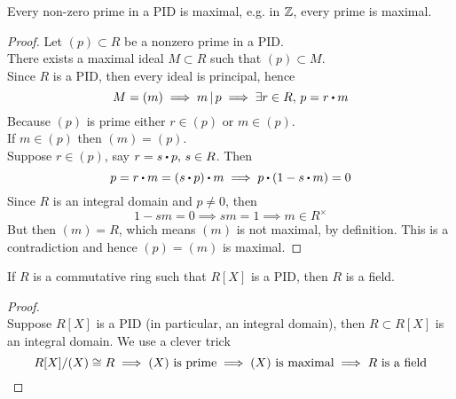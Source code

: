 \documentclass[../Main.tex]{subfiles}
\begin{document}
\begin{thm}[title = Nonzero primes ideals are maximal in PID]
	Every non-zero prime in a PID is maximal, e.g. in $\mathbb{Z}$, every prime is maximal.
\end{thm}
\begin{proof}
	Let $(p)\subset R$ be a nonzero prime in a PID.\\
	There exists a maximal ideal $M\subset R $ such that $(p)\subset M$.\\
	Since $R$ is a PID, then every ideal is principal, hence
	\[M=(m) \implies \divs{m}{p} \implies \exists r\in R, \, p=r\rdot m\]
	Because $(p)$ is prime either $r\in (p)$ or $m \in (p)$.\\
	If $m\in (p)$ then $(m)=(p)$. \\
	Suppose $r\in (p)$, say $r=s\rdot p,\, s\in R$. Then 
	\[p=r\rdot m=(s\rdot p)\rdot m \implies p\rdot (1-s\rdot m)=0\]
	Since $R$ is an integral domain and $p\ne 0$, then 
	\[1-sm=0\implies sm =1 \implies  m\in R^\times\]
	But then $(m) = R$, which means $(m)$ is not maximal, by definition. This is a contradiction and hence 
	$(p)=(m)$
	is maximal.
\end{proof}
\begin{thm}[title = If \texorpdfstring{$R[X]$}{R[X]} is PID then \texorpdfstring{$R$}{R} is field]
	If $R$ is a commutative ring such that $R[X]$ is a PID, then $R$ is a field.
\end{thm}
\begin{proof}~\\
	Suppose $R[X]$ is a PID (in particular, an integral domain), then $R\subset R[X]$ is an integral domain. We use a clever trick
	\[R[X]/(X) \cong R \implies (X) \text{ is prime} \implies (X) \text{ is maximal} \implies R \text{ is a field}\qedhere\]
\end{proof}
\end{document}
